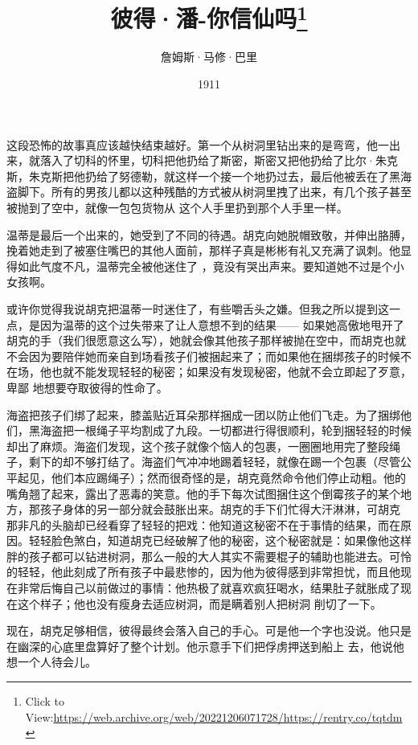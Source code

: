 \documentclass{article}
\title{彼得·潘-你信仙吗\footnote{Click to View:\url{https://web.archive.org/web/20221206071728/https://rentry.co/tqtdm}}}
\author{詹姆斯·马修·巴里}
\date{1911}
\begin{document}

\maketitle


\Large

﻿这段恐怖的故事真应该越快结束越好。第一个从树洞里钻出来的是弯弯，他一出来，就落入了切科的怀里，切科把他扔给了斯密，斯密又把他扔给了比尔·朱克斯，朱克斯把他扔给了努德勒，就这样一个接一个地扔过去，最后他被丢在了黑海盗脚下。所有的男孩儿都以这种残酷的方式被从树洞里拽了出来，有几个孩子甚至被抛到了空中，就像一包包货物从
这个人手里扔到那个人手里一样。 

温蒂是最后一个出来的，她受到了不同的待遇。胡克向她脱帽致敬，并伸出胳膊，挽着她走到了被塞住嘴巴的其他人面前，那样子真是彬彬有礼又充满了讽刺。他显得如此气度不凡，温蒂完全被他迷住了
，竟没有哭出声来。要知道她不过是个小女孩啊。 

\newpage

或许你觉得我说胡克把温蒂一时迷住了，有些嚼舌头之嫌。但我之所以提到这一点，是因为温蒂的这个过失带来了让人意想不到的结果—— 如果她高傲地甩开了胡克的手（我们很愿意这么写），她就会像其他孩子那样被抛在空中，而胡克也就不会因为要陪伴她而亲自到场看孩子们被捆起来了；而如果他在捆绑孩子的时候不在场，他也就不能发现轻轻的秘密；如果没有发现秘密，他就不会立即起了歹意，卑鄙
地想要夺取彼得的性命了。 

海盗把孩子们绑了起来，膝盖贴近耳朵那样捆成一团以防止他们飞走。为了捆绑他们，黑海盗把一根绳子平均割成了九段。一切都进行得很顺利，轮到捆轻轻的时候却出了麻烦。海盗们发现，这个孩子就像个恼人的包裹，一圈圈地用完了整段绳子，剩下的却不够打结了。海盗们气冲冲地踢着轻轻，就像在踢一个包裹（尽管公平起见，他们本应踢绳子）；然而很奇怪的是，胡克竟然命令他们停止动粗。他的嘴角翘了起来，露出了恶毒的笑意。他的手下每次试图捆住这个倒霉孩子的某个地方，那孩子身体的另一部分就会鼓胀出来。胡克的手下们忙得大汗淋淋，可胡克
\newpage
那非凡的头脑却已经看穿了轻轻的把戏：他知道这秘密不在于事情的结果，而在原因。轻轻脸色煞白，知道胡克已经破解了他的秘密，这个秘密就是：如果像他这样胖的孩子都可以钻进树洞，那么一般的大人其实不需要棍子的辅助也能进去。可怜的轻轻，他此刻成了所有孩子中最悲惨的，因为他为彼得感到非常担忧，而且他现在非常后悔自己以前做过的事情：他热极了就喜欢疯狂喝水，结果肚子就胀成了现在这个样子；他也没有瘦身去适应树洞，而是瞒着别人把树洞
削切了一下。 

现在，胡克足够相信，彼得最终会落入自己的手心。可是他一个字也没说。他只是在幽深的心底里盘算好了整个计划。他示意手下们把俘虏押送到船上
去，他说他想一个人待会儿。 
\end{document}
